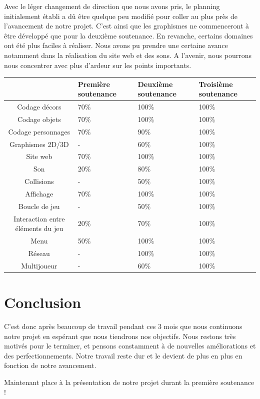 \documentclass{article}
\begin{document}
Avec le léger changement de direction que nous avons pris, le planning initialement établi a dû être quelque peu modifié pour coller au plus près de l'avancement de notre projet. C'est ainsi que les graphismes ne commenceront à être développé que pour la deuxième soutenance. En revanche, certains domaines ont été plus faciles à réaliser. Nous avons pu prendre une certaine avance notamment dans la réalisation du site web et des sons. A l'avenir, nous pourrons nous concentrer avec plus d'ardeur sur les points importants.
\begin{center}
\begin{tabular}{|c|p{2cm}|p{2cm}|p{2cm}|}


\hline
& Première soutenance & Deuxième soutenance & Troisième soutenance\\ 
\hline

Codage décors & 70\% & 100\% & 100\%\\
\hline
Codage objets & 70\% & 100\% & 100\%\\
\hline
Codage personnages & 70\% & 90\% & 100\%\\
\hline

Graphismes 2D/3D & - & 60\% & 100\%\\
\hline

Site web & 70\% & 100\% & 100\%\\
\hline

Son & 20\% & 80\% & 100\%\\
\hline

Collisions & - & 50\% & 100\%\\
\hline

Affichage & 70\% & 100\% & 100\%\\
\hline

Boucle de jeu & - & 50\% & 100\%\\
\hline

Interaction entre éléments du jeu & 20\% & 70\% & 100\%\\
\hline

Menu & 50\% & 100\% & 100\%\\
\hline

Réseau & - & 100\% & 100\%\\
\hline

Multijoueur & - & 60\% & 100\%\\
\hline

\end{tabular}
\end{center}

\section{Conclusion}

\par
C'est donc après beaucoup de travail pendant ces 3 mois que nous continuons notre projet en espérant que nous tiendrons nos objectifs. Nous restons très motivés pour le terminer, et pensons constamment à de nouvelles améliorations et des perfectionnements. Notre travail reste dur et le devient de plus en plus en fonction de notre avancement.
\newline

\par
Maintenant place à la présentation de notre projet durant la première soutenance !
\end{document}
